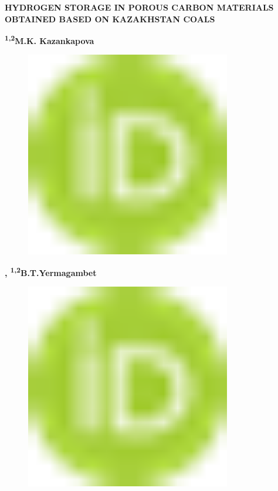 
{\bfseries HYDROGEN STORAGE IN POROUS CARBON MATERIALS OBTAINED BASED ON
KAZAKHSTAN COALS}

{\bfseries \textsuperscript{1,2}M.K.
Kazankapova}
\begin{figure}[H]
	\centering
	\includegraphics[width=0.8\textwidth]{media/chem2/image1}
	\caption*{}
\end{figure}
{\bfseries \textsuperscript{\envelope },
\textsuperscript{1,2}B.T.Yermagambet}
\begin{figure}[H]
	\centering
	\includegraphics[width=0.8\textwidth]{media/chem2/image1}
	\caption*{}
\end{figure}
